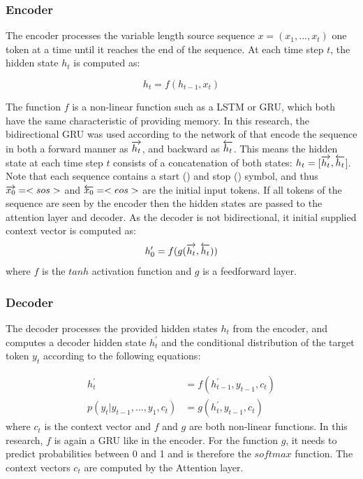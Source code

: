 \subsubsection{Encoder}
The encoder processes the variable length source sequence $x = (x_1,...,x_t)$ one token at a time until it reaches the end of the sequence. At each time step $t$, the hidden state $h_t$ is computed as:

$$h_t = f(h_{t-1},x_t)$$

The function $f$ is a non-linear function such as a LSTM or GRU, which both have the same characteristic of providing memory. In this research, the bidirectional GRU was used according to the network of \cite{bahdanau2014neural} that encode the sequence in both a forward manner as $\overrightarrow{h_t}$, and backward as $\overleftarrow{h_t}$. This means the hidden state at each time step $t$ consists of a concatenation of both states: $h_t= [\overrightarrow{h_t},\overleftarrow{h_t}$]. Note that each sequence contains a start () and stop () symbol, and thus $\overrightarrow{x_0} = <sos>$ and $\overleftarrow{x_0} = <eos>$ are the initial input tokens. If all tokens of the sequence are seen by the encoder then the hidden states are passed to the attention layer and decoder. As the decoder is not bidirectional, it initial supplied context vector is computed as:
$$h^{\prime}_0 = f(g(\overrightarrow{h_t},\overleftarrow{h_t}))$$
where $f$ is the $tanh$ activation function and $g$ is a feedforward layer.

\subsubsection{Decoder}
The decoder processes the provided hidden states $h_t$ from the encoder, and computes a decoder hidden state $h_t^{\prime}$ and the conditional distribution of the target token $y_t$ according to the following equations:

\begin{align*}
h_{t}^{\prime} &= f(h_{t-1}^{\prime}, y_{t-1}, c_{t}) \\
p(y_{t} | y_{t-1}, \ldots, y_{1}, c_{t}) &= g(h_{t}^{\prime}, y_{t-1}, c_{t})
\end{align*}
where $c_{t}$ is the context vector and $f$ and $g$ are both non-linear functions. In this research, $f$ is again a GRU like in the encoder. For the function $g$, it needs to predict probabilities between 0 and 1 and is therefore the $softmax$ function. The context vectors $c_{t}$ are computed by the Attention layer.

